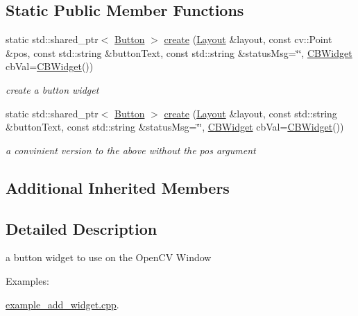 \subsection*{Static Public Member Functions}
\begin{DoxyCompactItemize}
\item 
static std\+::shared\+\_\+ptr$<$ \hyperlink{classcanvascv_1_1Button}{Button} $>$ \hyperlink{classcanvascv_1_1Button_a3557ea02dfca8d6cb92181a2d2b88112}{create} (\hyperlink{classcanvascv_1_1Layout}{Layout} \&layout, const cv\+::\+Point \&pos, const std\+::string \&button\+Text, const std\+::string \&status\+Msg=\char`\"{}\char`\"{}, \hyperlink{classcanvascv_1_1Widget_ad27bca771ee1c14454c77c91d9d49925}{C\+B\+Widget} cb\+Val=\hyperlink{classcanvascv_1_1Widget_ad27bca771ee1c14454c77c91d9d49925}{C\+B\+Widget}())
\begin{DoxyCompactList}\small\item\em create a button widget \end{DoxyCompactList}\item 
static std\+::shared\+\_\+ptr$<$ \hyperlink{classcanvascv_1_1Button}{Button} $>$ \hyperlink{classcanvascv_1_1Button_afcef2e139661b2b07da904899d83cfc8}{create} (\hyperlink{classcanvascv_1_1Layout}{Layout} \&layout, const std\+::string \&button\+Text, const std\+::string \&status\+Msg=\char`\"{}\char`\"{}, \hyperlink{classcanvascv_1_1Widget_ad27bca771ee1c14454c77c91d9d49925}{C\+B\+Widget} cb\+Val=\hyperlink{classcanvascv_1_1Widget_ad27bca771ee1c14454c77c91d9d49925}{C\+B\+Widget}())\hypertarget{classcanvascv_1_1Button_afcef2e139661b2b07da904899d83cfc8}{}\label{classcanvascv_1_1Button_afcef2e139661b2b07da904899d83cfc8}

\begin{DoxyCompactList}\small\item\em a convinient version to the above without the \textquotesingle{}pos\textquotesingle{} argument \end{DoxyCompactList}\end{DoxyCompactItemize}
\subsection*{Additional Inherited Members}


\subsection{Detailed Description}
a button widget to use on the Open\+CV Window \begin{Desc}
\item[Examples\+: ]\par
\hyperlink{example_add_widget_8cpp-example}{example\+\_\+add\+\_\+widget.\+cpp}.\end{Desc}



